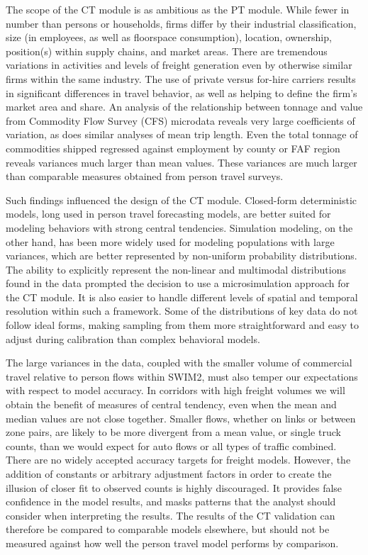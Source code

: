 The scope of the CT module is as ambitious as the PT module. While fewer in number than persons or households, firms differ by their industrial classification, size (in employees, as well as floorspace consumption), location, ownership, position(s) within supply chains, and market areas. There are tremendous variations in activities and levels of freight generation even by otherwise similar firms within the same industry. The use of private versus for-hire carriers results in significant differences in travel behavior, as well as helping to define the firm's market area and share. An analysis of the relationship between tonnage and value from Commodity Flow Survey (CFS) microdata reveals very large coefficients of variation, as does similar analyses of mean trip length. Even the total tonnage of commodities shipped regressed against employment by county or FAF region reveals variances much larger than mean values. These variances are much larger than comparable measures obtained from person travel surveys. 

Such findings influenced the design of the CT module. Closed-form deterministic models, long used in person travel forecasting models, are better suited for modeling behaviors with strong central tendencies. Simulation modeling, on the other hand, has been more widely used for modeling populations with large variances, which are better represented by non-uniform probability distributions. The ability to explicitly represent the non-linear and multimodal distributions found in the data prompted the decision to use a microsimulation approach for the CT module. It is also easier to handle different levels of spatial and temporal resolution within such a framework. Some of the distributions of key data do not follow ideal forms, making sampling from them more straightforward and easy to adjust during calibration than complex behavioral models.

The large variances in the data, coupled with the smaller volume of commercial travel relative to person flows within SWIM2, must also temper our expectations with respect to model accuracy. In corridors with high freight volumes we will obtain the benefit of measures of central tendency, even when the mean and median values are not close together. Smaller flows, whether on links or between zone pairs, are likely to be more divergent from a mean value, or single truck counts, than we would expect for auto flows or all types of traffic combined. There are no widely accepted accuracy targets for freight models. However, the addition of constants or arbitrary adjustment factors in order to create the illusion of closer fit to observed counts is highly discouraged. It provides false confidence in the model results, and masks patterns that the analyst should consider when interpreting the results. The results of the CT validation can therefore be compared to comparable models elsewhere, but should not be measured against how well the person travel model performs by comparison.

